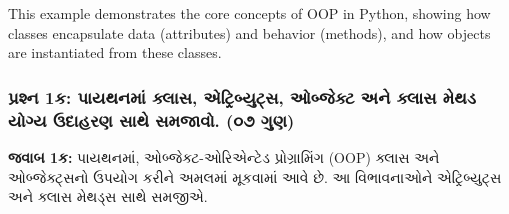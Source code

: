 This example demonstrates the core concepts of OOP in Python, showing
how classes encapsulate data (attributes) and behavior (methods), and
how objects are instantiated from these classes.

\begin{Shaded}
\begin{Highlighting}[]
\NormalTok{    \}}
\end{Highlighting}
\end{Shaded}

\hypertarget{uxaaauxab0uxab6uxaa8-1uxa95-uxaaauxaafuxaa5uxaa8uxaae-uxa95uxab2uxab8-uxa8fuxa9fuxab0uxaacuxaafuxa9fuxab8-uxa93uxaacuxa9cuxa95uxa9f-uxa85uxaa8-uxa95uxab2uxab8-uxaaeuxaa5uxaa1-uxaafuxa97uxaaf-uxa89uxaa6uxab9uxab0uxaa3-uxab8uxaa5-uxab8uxaaeuxa9cuxab5.-uxae6uxaed-uxa97uxaa3}{%
\subsubsection{પ્રશ્ન 1ક: પાયથનમાં ક્લાસ, એટ્રિબ્યુટ્સ, ઓબ્જેક્ટ અને ક્લાસ મેથડ યોગ્ય
ઉદાહરણ સાથે સમજાવો. (૦૭
ગુણ)}\label{uxaaauxab0uxab6uxaa8-1uxa95-uxaaauxaafuxaa5uxaa8uxaae-uxa95uxab2uxab8-uxa8fuxa9fuxab0uxaacuxaafuxa9fuxab8-uxa93uxaacuxa9cuxa95uxa9f-uxa85uxaa8-uxa95uxab2uxab8-uxaaeuxaa5uxaa1-uxaafuxa97uxaaf-uxa89uxaa6uxab9uxab0uxaa3-uxab8uxaa5-uxab8uxaaeuxa9cuxab5.-uxae6uxaed-uxa97uxaa3}}

\textbf{જવાબ 1ક:} પાયથનમાં, ઓબ્જેક્ટ-ઓરિએન્ટેડ પ્રોગ્રામિંગ (OOP) ક્લાસ અને
ઓબ્જેક્ટ્સનો ઉપયોગ કરીને અમલમાં મૂકવામાં આવે છે. આ વિભાવનાઓને એટ્રિબ્યુટ્સ અને ક્લાસ મેથડ્સ
સાથે સમજીએ.

